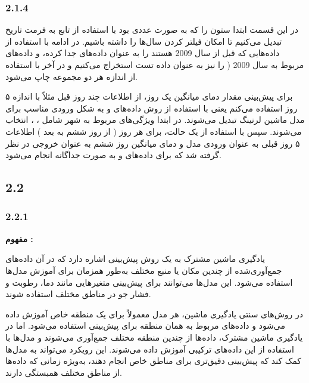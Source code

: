 \documentclass{article}
\begin{document}
\subsubsection{2.1.4}

در این قسمت ابتدا ستون  را که به صورت عددی بود با استفاده از تابع  به فرمت تاریخ تبدیل می‌کنیم تا امکان فیلتر کردن سال‌ها را داشته باشیم. در ادامه با استفاده از  داده‌هایی که قبل از سال 2009 هستند را به عنوان داده‌های  جدا کرده، و داده‌های مربوط به سال 2009 ( را نیز به عنوان داده تست استخراج می‌کنیم و در آخر با استفاده از  اندازه هر دو مجموعه چاپ می‌شود.

برای پیش‌بینی مقدار دمای میانگین یک روز، از اطلاعات چند روز قبل مثلاً با اندازه ۵ روز استفاده می‌کنم یعنی با استفاده از روش 
داده‌های  و  به شکل ورودی مناسب برای مدل ماشین لرنینگ تبدیل می‌شوند. در ابتدا ویژگی‌های مربوط به شهر  شامل 
، ،  
انتخاب می‌شوند. سپس با استفاده از یک حالت، برای هر روز ( از روز ششم به بعد ) اطلاعات ۵ روز قبلی به عنوان ورودی مدل و دمای میانگین روز ششم به عنوان خروجی در نظر گرفته شد که برای داده‌های  و  به صورت جداگانه انجام می‌شود.

\subsection{2.2}


\subsubsection{2.2.1}

\textbf{مفهوم :}

یادگیری ماشین مشترک به یک روش پیش‌بینی اشاره دارد که در آن داده‌های جمع‌آوری‌شده از چندین مکان یا منبع مختلف به‌طور همزمان برای آموزش مدل‌ها استفاده می‌شود. این مدل‌ها می‌توانند برای پیش‌بینی متغیرهایی مانند دما، رطوبت و فشار جو در مناطق مختلف استفاده شوند.

در روش‌های سنتی یادگیری ماشین، هر مدل معمولاً برای یک منطقه خاص آموزش داده می‌شود و داده‌های مربوط به همان منطقه برای پیش‌بینی استفاده می‌شود. اما در یادگیری ماشین مشترک، داده‌ها از چندین منطقه مختلف جمع‌آوری می‌شوند و مدل‌ها با استفاده از این داده‌های ترکیبی آموزش داده می‌شوند. این رویکرد می‌تواند به مدل‌ها کمک کند که پیش‌بینی دقیق‌تری برای مناطق خاص انجام دهند، به‌ویژه زمانی که داده‌ها از مناطق مختلف همبستگی دارند.
\end{document}
